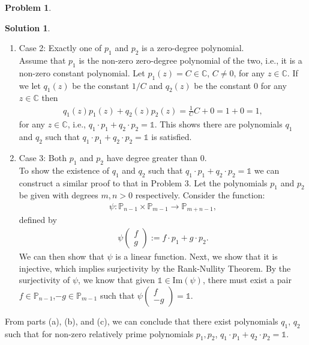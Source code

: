 \documentclass{book}
\theoremstyle{definition}
\newtheorem*{prob*}{Problem}
\newtheorem*{sln*}{Solution}
\newcommand{\ima}{\text{Im}}
\begin{document}
\begin{prob*}
\begin{sln*}
\begin{enumerate}
\begin{enumerate}
		\item Case 2: Exactly one of $p_1$ and $p_2$ is a zero-degree polynomial.\\
		
		Assume that $p_1$ is the non-zero zero-degree polynomial of the two, i.e., it is a non-zero constant polynomial. Let $p_1(z) = C \in \mathbb{C}$, $C\neq 0$, for any $z\in \mathbb{C}$. If we let $q_1(z)$ be the constant $1/C$ and $q_2(z)$ be the constant $0$ for any $z\in \mathbb{C}$ then
		\begin{align*}
		q_1(z) p_1(z) + q_2(z)p_2(z) = \frac{1}{C}C + 0 = 1 + 0 = 1,
		\end{align*}
		for any $z\in \mathbb{C}$, i.e., $q_1\cdot p_1 + q_2 \cdot p_2 = \mathbb{1}$. This shows there are polynomials $q_1$ and $q_2$ such that $q_1 \cdot p_1 + q_2 \cdot p_2 = \mathbb{1}$ is satisfied.\\
		
		\item Case 3: Both $p_1$ and $p_2$ have degree greater than 0. \\
		
		To show the existence of $q_1$ and $q_2$ such that $q_1 \cdot p_1 + q_2 \cdot p_2 = \mathbb{1}$ we can construct a similar proof to that in Problem 3. Let the polynomials $p_1$ and $p_2$ be given with degrees $m,n >0$ respectively. Consider the function:
		\begin{align}
		\psi : \mathbb{P}_{n-1} \times \mathbb{P}_{m-1} \to \mathbb{P}_{m+n-1},
		\end{align}
		defined by
		\begin{align}
		\psi\begin{pmatrix}
		f \\ g
		\end{pmatrix} := f \cdot p_1 + g\cdot p_2.
		\end{align}
		We can then show that $\psi$ is a linear function. Next, we show that it is injective, which implies surjectivity by the Rank-Nullity Theorem. By the surjectivity of $\psi$, we know that given $\mathbb{1} \in \ima(\psi)$, there must exist a pair $f\in \mathbb{P}_{n-1}$,$ -g \in \mathbb{P}_{m-1}$ such that $\psi\begin{pmatrix}
		f\\-g
		\end{pmatrix} = \mathbb{1}$. \\
		
	\end{enumerate}
	From parts (a), (b), and (c), we can conclude that there exist polynomials $q_1$, $q_2$ such that for non-zero relatively prime polynomials $p_1, p_2$, $q_1\cdot p_1 + q_2 \cdot p_2 = \mathbb{1}$.\\
	

\end{enumerate}
\end{sln*}
\end{prob*}
\end{document}
